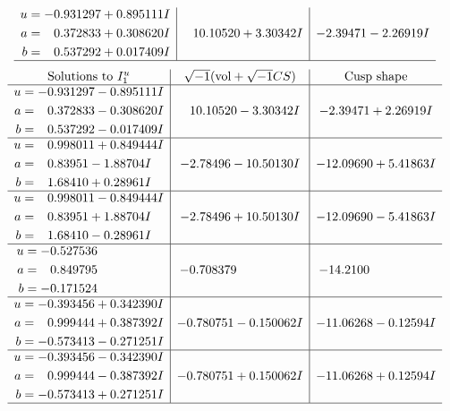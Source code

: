 \documentclass[1p]{elsarticle_modified}
\theoremstyle{definition}
\newcommand{\I}{\sqrt{-1}}
\begin{document}
$$\begin{array}{c|c|c}
\begin{aligned}
u &= -0.931297 + 0.895111 I \\
a &= \phantom{-}0.372833 + 0.308620 I \\
b &= \phantom{-}0.537292 + 0.017409 I\end{aligned}
 & \phantom{-}10.10520 + 3.30342 I & -2.39471 - 2.26919 I\\
 \hline 
 \end{array}$$\newpage$$\begin{array}{c|c|c}  
\text{Solutions to }I^u_{1}& \I (\text{vol} + \sqrt{-1}CS) & \text{Cusp shape}\\
 \hline 
\begin{aligned}
u &= -0.931297 - 0.895111 I \\
a &= \phantom{-}0.372833 - 0.308620 I \\
b &= \phantom{-}0.537292 - 0.017409 I\end{aligned}
 & \phantom{-}10.10520 - 3.30342 I & -2.39471 + 2.26919 I \\ \hline\begin{aligned}
u &= \phantom{-}0.998011 + 0.849444 I \\
a &= \phantom{-}0.83951 - 1.88704 I \\
b &= \phantom{-}1.68410 + 0.28961 I\end{aligned}
 & -2.78496 - 10.50130 I & -12.09690 + 5.41863 I \\ \hline\begin{aligned}
u &= \phantom{-}0.998011 - 0.849444 I \\
a &= \phantom{-}0.83951 + 1.88704 I \\
b &= \phantom{-}1.68410 - 0.28961 I\end{aligned}
 & -2.78496 + 10.50130 I & -12.09690 - 5.41863 I \\ \hline\begin{aligned}
u &= -0.527536\phantom{ +0.000000I} \\
a &= \phantom{-}0.849795\phantom{ +0.000000I} \\
b &= -0.171524\phantom{ +0.000000I}\end{aligned}
 & -0.708379\phantom{ +0.000000I} & -14.2100\phantom{ +0.000000I} \\ \hline\begin{aligned}
u &= -0.393456 + 0.342390 I \\
a &= \phantom{-}0.999444 + 0.387392 I \\
b &= -0.573413 - 0.271251 I\end{aligned}
 & -0.780751 - 0.150062 I & -11.06268 - 0.12594 I \\ \hline\begin{aligned}
u &= -0.393456 - 0.342390 I \\
a &= \phantom{-}0.999444 - 0.387392 I \\
b &= -0.573413 + 0.271251 I\end{aligned}
 & -0.780751 + 0.150062 I & -11.06268 + 0.12594 I\\
 \hline 
 \end{array}$$\newpage\newpage\renewcommand{\arraystretch}{1}
\end{document}
